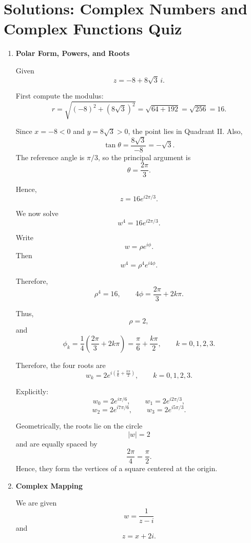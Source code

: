 \section*{Solutions: Complex Numbers and Complex Functions Quiz}

\begin{enumerate}
    \item \textbf{Polar Form, Powers, and Roots}

    Given
    \[
        z=-8+8\sqrt{3}\,i.
    \]

    First compute the modulus:
    \[
        r=\sqrt{(-8)^2+(8\sqrt{3})^2}
        =
        \sqrt{64+192}
        =
        \sqrt{256}
        =
        16.
    \]

    Since $x=-8<0$ and $y=8\sqrt{3}>0$, the point lies in Quadrant II. Also,
    \[
        \tan\theta=\frac{8\sqrt{3}}{-8}=-\sqrt{3}.
    \]
    The reference angle is $\pi/3$, so the principal argument is
    \[
        \theta=\frac{2\pi}{3}.
    \]

    Hence,
    \[
        z=16e^{i2\pi/3}.
    \]

    We now solve
    \[
        w^4=16e^{i2\pi/3}.
    \]

    Write
    \[
        w=\rho e^{i\phi}.
    \]
    Then
    \[
        w^4=\rho^4e^{i4\phi}.
    \]

    Therefore,
    \[
        \rho^4=16,
        \qquad
        4\phi=\frac{2\pi}{3}+2k\pi.
    \]

    Thus,
    \[
        \rho=2,
    \]
    and
    \[
        \phi_k=\frac{1}{4}\left(\frac{2\pi}{3}+2k\pi\right)
        =
        \frac{\pi}{6}+\frac{k\pi}{2},
        \qquad k=0,1,2,3.
    \]

    Therefore, the four roots are
    \[
        w_k=2e^{i\left(\frac{\pi}{6}+\frac{k\pi}{2}\right)},
        \qquad k=0,1,2,3.
    \]

    Explicitly:
    \[
        w_0=2e^{i\pi/6},
        \qquad
        w_1=2e^{i2\pi/3},
    \]
    \[
        w_2=2e^{i7\pi/6},
        \qquad
        w_3=2e^{i5\pi/3}.
    \]

    Geometrically, the roots lie on the circle
    \[
        |w|=2
    \]
    and are equally spaced by
    \[
        \frac{2\pi}{4}=\frac{\pi}{2}.
    \]
    Hence, they form the vertices of a square centered at the origin.

    \item \textbf{Complex Mapping}

    We are given
    \[
        w=\frac{1}{z-i}
    \]
    and
    \[
        z=x+2i.
    \]


\end{enumerate}
